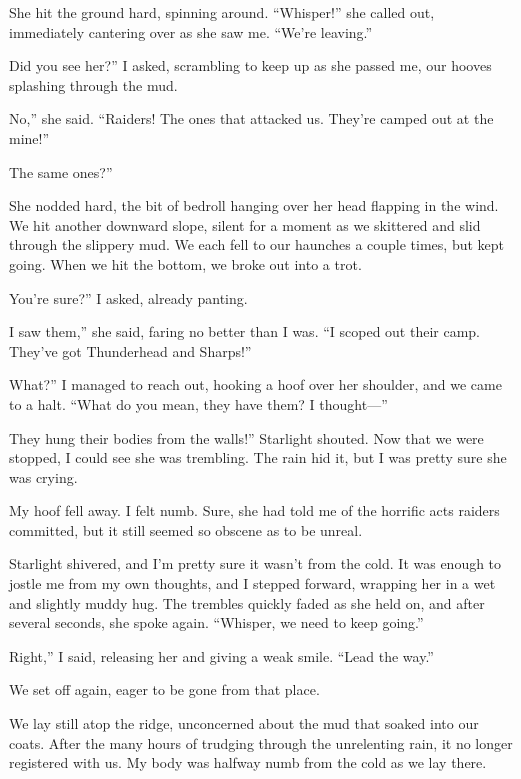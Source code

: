 She hit the ground hard, spinning around. “Whisper!” she called out, immediately cantering over as she saw me. “We’re leaving.”

\leavevmode{}Did you see her?” I asked, scrambling to keep up as she passed me, our hooves splashing through the mud.

\leavevmode{}No,” she said. “Raiders! The ones that attacked us. They’re camped out at the mine!”

\leavevmode{}The same ones?”

She nodded hard, the bit of bedroll hanging over her head flapping in the wind. We hit another downward slope, silent for a moment as we skittered and slid through the slippery mud. We each fell to our haunches a couple times, but kept going. When we hit the bottom, we broke out into a trot.

\leavevmode{}You’re sure?” I asked, already panting.

\leavevmode{}I saw them,” she said, faring no better than I was. “I scoped out their camp. They’ve got Thunderhead and Sharps!”

\leavevmode{}What?” I managed to reach out, hooking a hoof over her shoulder, and we came to a halt. “What do you mean, they have them? I thought—”

\leavevmode{}They hung their bodies from the walls!” Starlight shouted. Now that we were stopped, I could see she was trembling. The rain hid it, but I was pretty sure she was crying.

My hoof fell away. I felt numb. Sure, she had told me of the horrific acts raiders committed, but it still seemed so obscene as to be unreal.

Starlight shivered, and I’m pretty sure it wasn’t from the cold. It was enough to jostle me from my own thoughts, and I stepped forward, wrapping her in a wet and slightly muddy hug. The trembles quickly faded as she held on, and after several seconds, she spoke again. “Whisper, we need to keep going.”

\leavevmode{}Right,” I said, releasing her and giving a weak smile. “Lead the way.”

We set off again, eager to be gone from that place.

{\br}%
We lay still atop the ridge, unconcerned about the mud that soaked into our coats. After the many hours of trudging through the unrelenting rain, it no longer registered with us. My body was halfway numb from the cold as we lay there.

